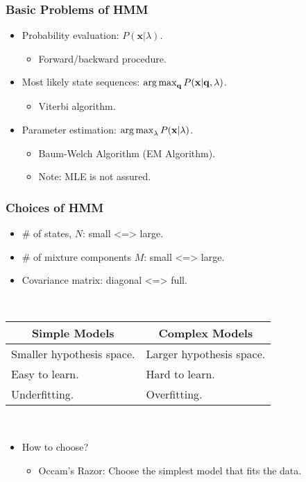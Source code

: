 \documentclass{beamer}
\begin{document}
\begin{frame}
  \frametitle{Basic Problems of HMM}

  \begin{itemize}
    \item Probability evaluation: $ P(\mathbf{x}|\lambda) $.
      \begin{itemize}
        \item Forward/backward procedure. 
      \end{itemize}

    \item Most likely state sequences: $ \operatorname*{arg\,max}_{\mathbf{q}} P(\mathbf{x}|\mathbf{q},\lambda) $.
      \begin{itemize}
        \item Viterbi algorithm.
      \end{itemize}

    \item Parameter estimation: $ \operatorname*{arg\,max}_{\lambda} P(\mathbf{x}|\lambda) $.
      \begin{itemize}
        \item Baum-Welch Algorithm (EM Algorithm).
        \item Note: MLE is not assured.
      \end{itemize}
  \end{itemize}
\end{frame}

\begin{frame}
  \frametitle{Choices of HMM}

  \begin{itemize}
    \item \# of states, $N$: \hfill small <=> large.
    \item \# of mixture components $M$: \hfill small <=> large.
    \item Covariance matrix: \hfill diagonal <=> full.
  \end{itemize}

  ~

  \centering
    \begin{tabular}{p{}|p{}}
      \hline
      \multicolumn{1}{c|}{\bfseries Simple Models} & \multicolumn{1}{c}{\bfseries Complex Models} \\ \hline
    Smaller hypothesis space. & Larger hypothesis space. \\
    Easy to learn. & Hard to learn. \\
    Underfitting. & Overfitting. \\ \hline
  \end{tabular}

  ~

  \begin{itemize}
    \item How to choose?
      \begin{itemize}
        \item Occam's Razor: Choose the simplest model that fits the data.
      \end{itemize}
  \end{itemize}
\end{frame}
\end{document}
